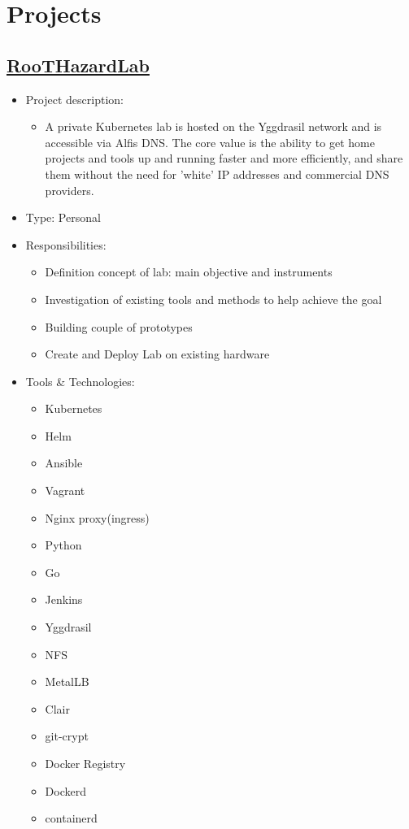 \section{Projects}

\hypertarget{proj_rhl}{\subsection{\href{https://github.com/dkushche/RooTHazardLab}{RooTHazardLab}}}
\begin{itemize}
    \item Project description:
    \begin{itemize}
        \item A private Kubernetes lab is hosted on the Yggdrasil network and is accessible via Alfis DNS.
              The core value is the ability to get home projects and tools up and running faster and
              more efficiently, and share them without the need for 'white' IP addresses and commercial DNS
              providers.
    \end{itemize}
    \item Type: Personal
    \item Responsibilities:
    \begin{itemize}
        \item Definition concept of lab: main objective and instruments
        \item Investigation of existing tools and methods to help achieve the goal
        \item Building couple of prototypes
        \item Create and Deploy Lab on existing hardware
    \end{itemize}
    \item Tools \& Technologies:
    \begin{itemize}
        \item Kubernetes
        \item Helm
        \item Ansible
        \item Vagrant
        \item Nginx proxy(ingress)
        \item Python
        \item Go
        \item Jenkins
        \item Yggdrasil
        \item NFS
        \item MetalLB
        \item Clair
        \item git-crypt
        \item Docker Registry
        \item Dockerd
        \item containerd
    \end{itemize}
\end{itemize}
\newpage

